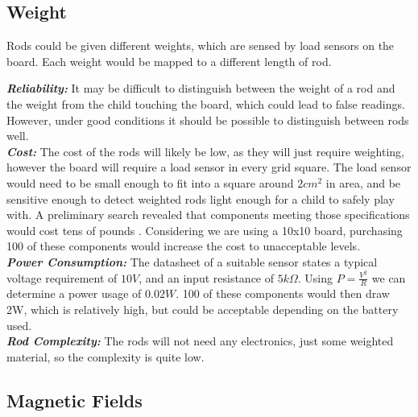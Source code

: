 
\subsection{Weight}
\label{weight}

Rods could be given different weights, which are sensed by load sensors on the board. Each weight would be mapped to a different length of rod.\\

{
\setlength{\parindent}{0pt} %

\textbf{\textit{Reliability:}} It may be difficult to distinguish between the weight of a rod and the weight from the child touching the board, which could lead to false readings. However, under good conditions it should be possible to distinguish between rods well.\\

\textbf{\textit{Cost:}} The cost of the rods will likely be low, as they will just require weighting, however the board will require a load sensor in every grid square. The load sensor would need to be small enough to fit into a square around $2cm^2$ in area, and be sensitive enough to detect weighted rods light enough for a child to safely play with. A preliminary search revealed that components meeting those specifications would cost tens of pounds  \cite{ref:loadsensor}. Considering we are using a 10x10 board, purchasing 100 of these components would increase the cost to unacceptable levels.    \\

\textbf{\textit{Power Consumption:}} The datasheet of a suitable sensor \cite{MICROSWI18:online} states a typical voltage requirement of $10V$, and an input resistance of $5k\Omega$. Using $P=\frac{V^2}{R}$ we can determine a power usage of $0.02W$. 100 of these components would then draw 2W, which is relatively high, but could be acceptable depending on the battery used. \\

\textbf{\textit{Rod Complexity:}} The rods will not need any electronics, just some weighted material, so the complexity is quite low.\\
}


\subsection{Magnetic Fields}
\label{magnets}

